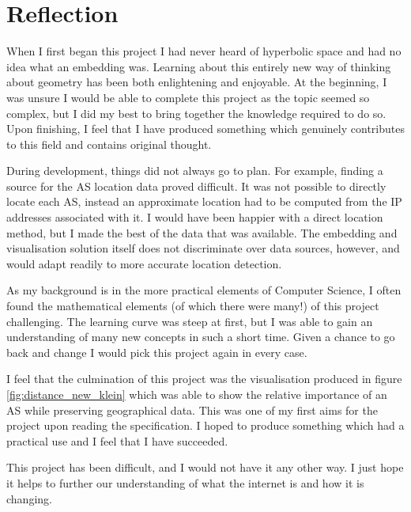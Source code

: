 \chapter{Reflection}
When I first began this project I had never heard of hyperbolic space and had no idea what an embedding was. Learning about this entirely new way of thinking about geometry has been both enlightening and enjoyable. At the beginning, I was unsure I would be able to complete this project as the topic seemed so complex, but I did my best to bring together the knowledge required to do so. Upon finishing, I feel that I have produced something which genuinely contributes to this field and contains original thought.

During development, things did not always go to plan. For example, finding a source for the AS location data proved difficult. It was not possible to directly locate each AS, instead an approximate location had to be computed from the IP addresses associated with it. I would have been happier with a direct location method, but I made the best of the data that was available. The embedding and visualisation solution itself does not discriminate over data sources, however, and would adapt readily to more accurate location detection.

As my background is in the more practical elements of Computer Science, I often found the mathematical elements (of which there were many!) of this project challenging. The learning curve was steep at first, but I was able to gain an understanding of many new concepts in such a short time. Given a chance to go back and change I would pick this project again in every case.

I feel that the culmination of this project was the visualisation produced in figure \ref{fig:distance_new_klein} which was able to show the relative importance of an AS while preserving geographical data. This was one of my first aims for the project upon reading the specification. I hoped to produce something which had a practical use and I feel that I have succeeded.

This project has been difficult, and I would not have it any other way. I just hope it helps to further our understanding of what the internet is and how it is changing.